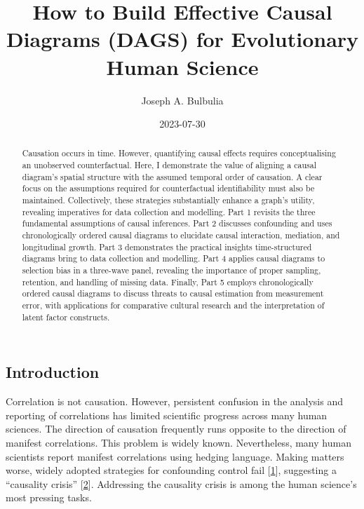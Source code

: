 \documentclass[
  singlecolumn]{article}
\title{How to Build Effective Causal Diagrams (DAGS) for Evolutionary
Human Science}
\author{Joseph A. Bulbulia}
\affil{%
                  Victoria University of Wellington, New Zealand, School
                  of Psychology, Centre for Applied Cross-Cultural
                  Research
              }
\date{2023-07-30}
\begin{document}
\maketitle
\begin{abstract}
Causation occurs in time. However, quantifying causal effects requires
conceptualising an unobserved counterfactual. Here, I demonstrate the
value of aligning a causal diagram's spatial structure with the assumed
temporal order of causation. A clear focus on the assumptions required
for counterfactual identifiability must also be maintained.
Collectively, these strategies substantially enhance a graph's utility,
revealing imperatives for data collection and modelling. Part 1 revisits
the three fundamental assumptions of causal inferences. Part 2 discusses
confounding and uses chronologically ordered causal diagrams to
elucidate causal interaction, mediation, and longitudinal growth. Part 3
demonstrates the practical insights time-structured diagrams bring to
data collection and modelling. Part 4 applies causal diagrams to
selection bias in a three-wave panel, revealing the importance of proper
sampling, retention, and handling of missing data. Finally, Part 5
employs chronologically ordered causal diagrams to discuss threats to
causal estimation from measurement error, with applications for
comparative cultural research and the interpretation of latent factor
constructs.
\end{abstract}
\ifdefined\Shaded\renewenvironment{Shaded}{\begin{tcolorbox}[interior hidden, borderline west={3pt}{0pt}{shadecolor}, enhanced, boxrule=0pt, breakable, frame hidden, sharp corners]}{\end{tcolorbox}}\fi

\hypertarget{introduction}{%
\subsection{Introduction}\label{introduction}}

Correlation is not causation. However, persistent confusion in the
analysis and reporting of correlations has limited scientific progress
across many human sciences. The direction of causation frequently runs
opposite to the direction of manifest correlations. This problem is
widely known. Nevertheless, many human scientists report manifest
correlations using hedging language. Making matters worse, widely
adopted strategies for confounding control fail
{[}\protect\hyperlink{ref-mcelreath2020}{1}{]}, suggesting a ``causality
crisis'' {[}\protect\hyperlink{ref-bulbulia2022}{2}{]}. Addressing the
causality crisis is among the human science's most pressing tasks.
\end{document}
